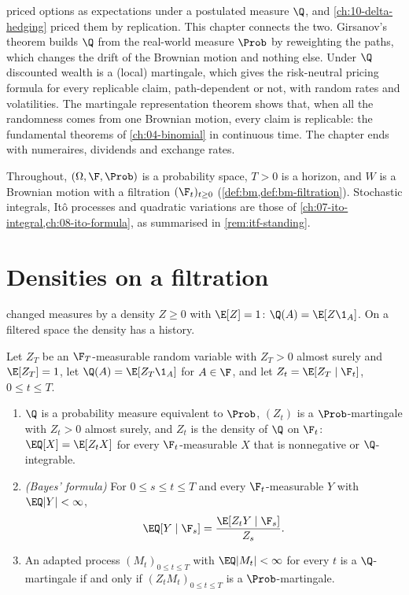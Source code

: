 
 priced options as expectations under a postulated
measure $\Q$, and \cref{ch:10-delta-hedging} priced them by replication. This chapter
connects the two. Girsanov's theorem builds $\Q$ from the real-world measure $\Prob$ by
reweighting the paths, which changes the drift of the Brownian motion and nothing else. Under
$\Q$ discounted wealth is a (local) martingale, which gives the risk-neutral pricing formula for
every replicable claim, path-dependent or not, with random rates and volatilities. The
martingale representation theorem shows that, when all the randomness comes from one Brownian
motion, every claim is replicable: the fundamental theorems of \cref{ch:04-binomial} in
continuous time. The chapter ends with numeraires, dividends and exchange rates.

Throughout, $(\Omega,\F,\Prob)$ is a probability space, $T>0$ is a horizon, and $W$ is a
Brownian motion with a filtration $(\F_t)_{t\ge0}$ (\cref{def:bm,def:bm-filtration}).
Stochastic integrals, It\^o processes and quadratic variations are those of
\cref{ch:07-ito-integral,ch:08-ito-formula}, as summarised in \cref{rem:itf-standing}.

\section{Densities on a filtration}\label{sec:rn-densities}

 changed measures by a density $Z\ge0$ with $\E[Z]=1$:
$\Q(A)=\E[Z\1_A]$. On a filtered space the density has a history.

\begin{lemma}\label{lem:rn-density}
Let $Z_T$ be an $\F_T$-measurable random variable with $Z_T>0$ almost surely and
$\E[Z_T]=1$, let $\Q(A)=\E[Z_T\1_A]$ for $A\in\F$, and let $Z_t=\E[Z_T\mid\F_t]$,
$0\le t\le T$.
\begin{enumerate}[label=(\roman*)]
  \item $\Q$ is a probability measure equivalent to $\Prob$, $(Z_t)$ is a $\Prob$-martingale
    with $Z_t>0$ almost surely, and $Z_t$ is the density of $\Q$ on $\F_t$: $\EQ[X]=\E[Z_tX]$
    for every $\F_t$-measurable $X$ that is nonnegative or $\Q$-integrable.
  \item \emph{(Bayes' formula)} For $0\le s\le t\le T$ and every $\F_t$-measurable $Y$ with
    $\EQ|Y|<\infty$,
    \[
      \EQ[Y\mid\F_s]=\frac{\E[Z_tY\mid\F_s]}{Z_s}.
    \]
  \item An adapted process $(M_t)_{0\le t\le T}$ with $\EQ|M_t|<\infty$ for every $t$ is a
    $\Q$-martingale if and only if $(Z_tM_t)_{0\le t\le T}$ is a $\Prob$-martingale.
\end{enumerate}
\end{lemma}

